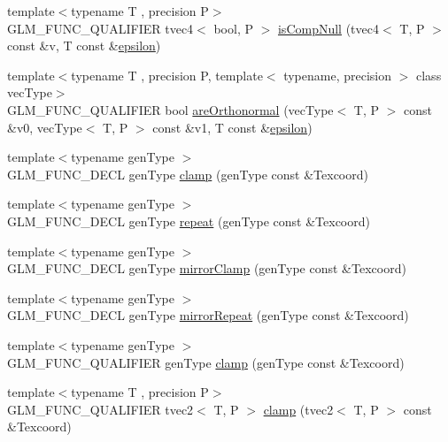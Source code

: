\begin{DoxyCompactItemize}
\item 
{\footnotesize template$<$typename T , precision P$>$ }\\G\+L\+M\+\_\+\+F\+U\+N\+C\+\_\+\+Q\+U\+A\+L\+I\+F\+I\+E\+R tvec4$<$ bool, P $>$ \hyperlink{namespaceglm_ac4b73e500deea02815aa386fe10296c8}{is\+Comp\+Null} (tvec4$<$ T, P $>$ const \&v, T const \&\hyperlink{group__gtc__constants_ga2a1e57fc5592b69cfae84174cbfc9429}{epsilon})
\item 
{\footnotesize template$<$typename T , precision P, template$<$ typename, precision $>$ class vec\+Type$>$ }\\G\+L\+M\+\_\+\+F\+U\+N\+C\+\_\+\+Q\+U\+A\+L\+I\+F\+I\+E\+R bool \hyperlink{group__gtx__vector__query_ga89c82bc60e5b84e4489b74c15a134caf}{are\+Orthonormal} (vec\+Type$<$ T, P $>$ const \&v0, vec\+Type$<$ T, P $>$ const \&v1, T const \&\hyperlink{group__gtc__constants_ga2a1e57fc5592b69cfae84174cbfc9429}{epsilon})
\item 
{\footnotesize template$<$typename gen\+Type $>$ }\\G\+L\+M\+\_\+\+F\+U\+N\+C\+\_\+\+D\+E\+C\+L gen\+Type \hyperlink{group__gtx__wrap_ga6c0cc6bd1d67ea1008d2592e998bad33}{clamp} (gen\+Type const \&Texcoord)
\item 
{\footnotesize template$<$typename gen\+Type $>$ }\\G\+L\+M\+\_\+\+F\+U\+N\+C\+\_\+\+D\+E\+C\+L gen\+Type \hyperlink{group__gtx__wrap_ga809650c6310ea7c42666e918c117fb6f}{repeat} (gen\+Type const \&Texcoord)
\item 
{\footnotesize template$<$typename gen\+Type $>$ }\\G\+L\+M\+\_\+\+F\+U\+N\+C\+\_\+\+D\+E\+C\+L gen\+Type \hyperlink{group__gtx__wrap_gaa6856a0a048d2749252848da35e10c8b}{mirror\+Clamp} (gen\+Type const \&Texcoord)
\item 
{\footnotesize template$<$typename gen\+Type $>$ }\\G\+L\+M\+\_\+\+F\+U\+N\+C\+\_\+\+D\+E\+C\+L gen\+Type \hyperlink{group__gtx__wrap_ga16a89b0661b60d5bea85137bbae74d73}{mirror\+Repeat} (gen\+Type const \&Texcoord)
\item 
{\footnotesize template$<$typename gen\+Type $>$ }\\G\+L\+M\+\_\+\+F\+U\+N\+C\+\_\+\+Q\+U\+A\+L\+I\+F\+I\+E\+R gen\+Type \hyperlink{group__gtx__wrap_ga6c0cc6bd1d67ea1008d2592e998bad33}{clamp} (gen\+Type const \&Texcoord)
\item 
{\footnotesize template$<$typename T , precision P$>$ }\\G\+L\+M\+\_\+\+F\+U\+N\+C\+\_\+\+Q\+U\+A\+L\+I\+F\+I\+E\+R tvec2$<$ T, P $>$ \hyperlink{namespaceglm_a44107199d20102cbd6c9b64f72cfba55}{clamp} (tvec2$<$ T, P $>$ const \&Texcoord)

\end{DoxyCompactItemize}
